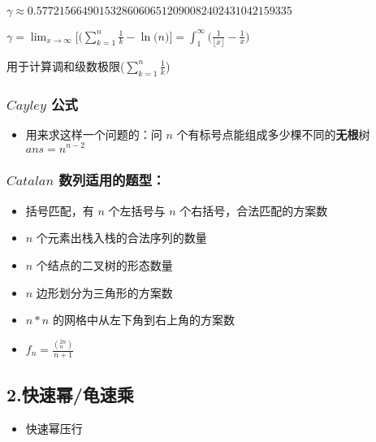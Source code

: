 \documentclass[]{article}
\providecommand{\tightlist}{%
  \setlength{\itemsep}{0pt}\setlength{\parskip}{0pt}}
\begin{document}
\(\gamma \approx 0.57721 56649 01532 86060 65120 90082 40243 10421 59335\)

\(\gamma = \lim_{x \to \infty} \big[\big(\sum^{n}_{k = 1} \frac{1}{k} - \ln(n\big)\big] = \int_{1}^{\infty} \big(\frac{1}{\lfloor x \rfloor} - \frac{1}{x} \big)\)

用于计算调和级数极限(\(\sum^n_{k = 1} \frac{1}{k}\))

\hypertarget{cayley-ux516cux5f0f}{%
\subsubsection{\texorpdfstring{\(Cayley\)
公式}{Cayley 公式}}\label{cayley-ux516cux5f0f}}

\begin{itemize}
\tightlist
\item
  用来求这样一个问题的：问 \(n\)
  个有标号点能组成多少棵不同的\textbf{无根}树 \(ans=n^{n-2}\)
\end{itemize}

\hypertarget{catalan-ux6570ux5217ux9002ux7528ux7684ux9898ux578b}{%
\subsubsection{\texorpdfstring{\(Catalan\)
数列适用的题型：}{Catalan 数列适用的题型：}}\label{catalan-ux6570ux5217ux9002ux7528ux7684ux9898ux578b}}

\begin{itemize}
\item
  括号匹配，有 \(n\) 个左括号与 \(n\) 个右括号，合法匹配的方案数
\item
  \(n\) 个元素出栈入栈的合法序列的数量
\item
  \(n\) 个结点的二叉树的形态数量
\item
  \(n\) 边形划分为三角形的方案数
\item
  \(n*n\) 的网格中从左下角到右上角的方案数
\item
  \(f_n=\frac{(_n^{2n})}{n+1}\)
\end{itemize}

\hypertarget{ux5febux901fux5e42ux9f9fux901fux4e58}{%
\subsection{2.快速幂/龟速乘}\label{ux5febux901fux5e42ux9f9fux901fux4e58}}

\begin{itemize}
\tightlist
\item
  快速幂压行
\end{itemize}
\end{document}
